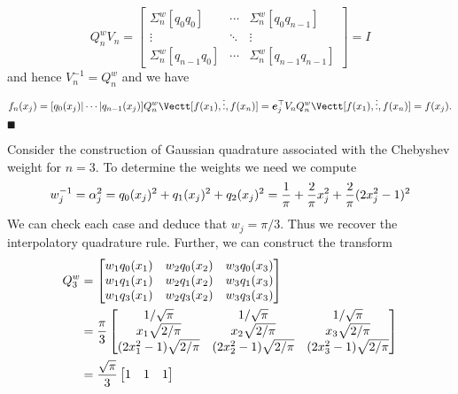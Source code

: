 \[
Q_n^w V_n = \begin{bmatrix} \ensuremath{\Sigma}_n^w[q_0 q_0] & \ensuremath{\cdots} & \ensuremath{\Sigma}_n^w[q_0 q_{n-1}]\\
                \ensuremath{\vdots} & \ensuremath{\ddots} & \ensuremath{\vdots} \\
                \ensuremath{\Sigma}_n^w[q_{n-1} q_0] & \ensuremath{\cdots} & \ensuremath{\Sigma}_n^w[q_{n-1} q_{n-1}]
                \end{bmatrix} = I
\]
and hence $V_n^{-1} = Q_n^w$ and we have
\[
f_n(x_j) = [q_0(x_j) | \ensuremath{\cdots} | q_{n-1}(x_j)] Q_n^w \Vectt[f(x_1),\ensuremath{\vdots},f(x_n)] = \ensuremath{\bm{\e}}_j^\ensuremath{\top} V_n  Q_n^w \Vectt[f(x_1),\ensuremath{\vdots},f(x_n)] = f(x_j).
\]
\ensuremath{\QED}

\begin{example}  Consider the construction of Gaussian quadrature associated with the Chebyshev weight for $n = 3$.  To determine the weights we need we compute
\[
w_j^{-1} = \ensuremath{\alpha}_j^2 = q_0(x_j)^2 + q_1(x_j)^2 + q_2(x_j)^2 = 
{1 \over \ensuremath{\pi}} + {2 \over \ensuremath{\pi}} x_j^2 + {2 \over \ensuremath{\pi}} (2x_j^2-1)^2
\]
We can check each case and deduce that $w_j = \ensuremath{\pi}/3$. Thus we recover the interpolatory quadrature rule. Further, we can construct the transform
\begin{align*}
Q_3^w &= \begin{bmatrix}
w_1 q_0(x_1) & w_2 q_0(x_2) & w_3 q_0(x_3) \\
w_1 q_1(x_1) & w_2 q_1(x_2) & w_3 q_1(x_3) \\
w_1 q_3(x_1) & w_2 q_3(x_2) & w_3 q_3(x_3) 
\end{bmatrix}\\
&= {\ensuremath{\pi} \over 3} \begin{bmatrix} 1/\sqrt{\ensuremath{\pi}} & 1/\sqrt{\ensuremath{\pi}} & 1/\sqrt{\ensuremath{\pi}} \\
                                x_1\sqrt{2/\ensuremath{\pi}} & x_2\sqrt{2/\ensuremath{\pi}} & x_3\sqrt{2/\ensuremath{\pi}} \\
                                (2x_1^2-1)\sqrt{2/\ensuremath{\pi}} &(2x_2^2-1)\sqrt{2/\ensuremath{\pi}} & (2x_3^2-1)\sqrt{2/\ensuremath{\pi}}
                                \end{bmatrix} \\
                                &= 
                                {\sqrt{\ensuremath{\pi}} \over 3} \begin{bmatrix} 1 & 1 & 1 \\

\end{bmatrix}
\end{align*}
\end{example}
